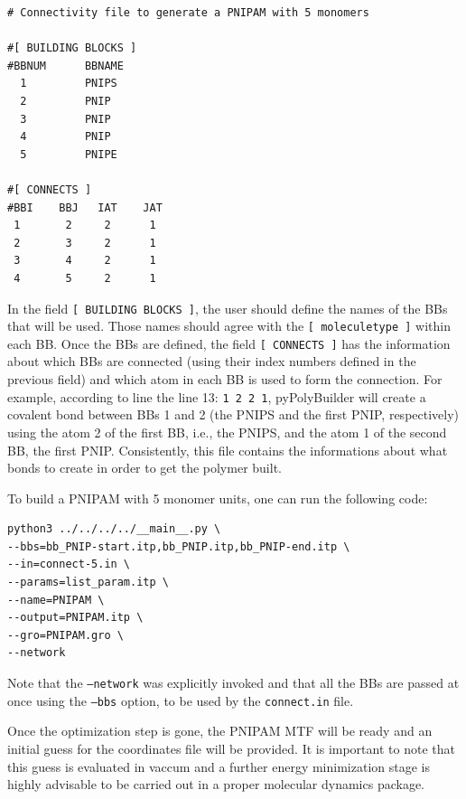 \begin{lstlisting}
# Connectivity file to generate a PNIPAM with 5 monomers

#[ BUILDING BLOCKS ]
#BBNUM      BBNAME
  1     	PNIPS
  2     	PNIP
  3     	PNIP
  4	        PNIP
  5         PNIPE

#[ CONNECTS ]
#BBI    BBJ   IAT    JAT
 1       2     2      1
 2       3     2      1
 3       4     2      1
 4       5     2      1
\end{lstlisting}

In the field \texttt{[ BUILDING BLOCKS ]}, the user should define the names of the BBs that will be used.
Those names should agree with the \texttt{[ moleculetype ]} within each BB.
Once the BBs are defined, the field \texttt{[ CONNECTS ]} has the information about which BBs are connected (using their index numbers defined in the previous field) and which atom in each BB is used to form the connection.
For example, according to line the line 13: \texttt{1       2     2      1}, pyPolyBuilder will create a covalent bond between BBs 1 and 2 (the PNIPS and the first PNIP, respectively) using the atom 2 of the first BB, i.e., the PNIPS, and the atom 1 of the second BB, the first PNIP.
Consistently, this file contains the informations about what bonds to create in order to get the polymer built.

To build a PNIPAM with 5 monomer units, one can run the following code:

\begin{lstlisting}
python3 ../../../../__main__.py \
--bbs=bb_PNIP-start.itp,bb_PNIP.itp,bb_PNIP-end.itp \
--in=connect-5.in \
--params=list_param.itp \
--name=PNIPAM \
--output=PNIPAM.itp \
--gro=PNIPAM.gro \
--network
\end{lstlisting}

Note that the \texttt{--network} was explicitly invoked and that all the BBs are passed at once using the \texttt{--bbs} option, to be used by the \texttt{connect.in} file.

Once the optimization step is gone, the PNIPAM MTF will be ready and an initial guess for the coordinates file will be provided.
It is important to note that this guess is evaluated in vaccum and a further energy minimization stage is highly advisable to be carried out in a proper molecular dynamics package.

